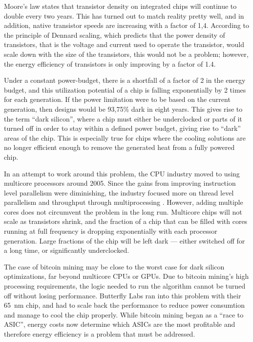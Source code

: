Moore's law states that transistor density on integrated chips will continue to double every
two years. This has turned out to match reality pretty well, and in addition, native transistor speeds are increasing with a factor of 1,4.
According to the principle of Dennard scaling, which predicts that the power density of transistors, that
is the voltage and current used to operate the transistor, would scale down with the
size of the transistors, this would not be a problem; however, the energy efficiency
of transistors is only improving by a factor of 1.4.

Under a constant power-budget, there is a shortfall of a factor of 2 in the energy budget,
and this utilization potential of a chip is falling exponentially by 2 times for each generation.
If the power limitation were to be based on the current generation, then designs would be 93,75\% dark in eight years.
This gives rise to the term ``dark silicon'', where a chip must either be underclocked or parts of
it turned off in order to stay within a defined power budget, giving rise to ``dark'' areas of the chip.
This is especially true for chips where the cooling solutions are no longer efficient enough to remove
the generated heat from a fully powered chip.

In an attempt to work around this problem, the CPU industry moved to using multicore processors around 2005.
Since the gains from improving instruction level parallelism were diminishing, the industry focused more on thread level parallelism and throughput through multiprocessing \cite{computer-architecture}.
However, adding multiple cores does not circumvent the problem in the long run.
Multicore chips will not scale as transistors shrink, and the fraction of a chip that can be filled with cores running at full frequency is dropping exponentially with each processor generation. 
Large fractions of the chip will be left dark --- either switched off for a long time, or significantly underclocked. \cite{dark-silicon}

The case of bitcoin mining may be close to the worst case for dark silicon optimizations, far beyond multicore CPUs or GPUs. 
Due to bitcoin mining's high processing requirements, the logic needed to run the algorithm cannot be turned off without losing performance.
Butterfly Labs ran into this problem with their 65~nm chip, and had to scale back the performance to reduce power consumtion and manage to cool the chip properly. While bitcoin mining began as a ``race to ASIC'', energy costs now determine which ASICs are the most profitable and therefore energy efficiency is a problem that must be addressed. \cite{bespoke-silicon}

